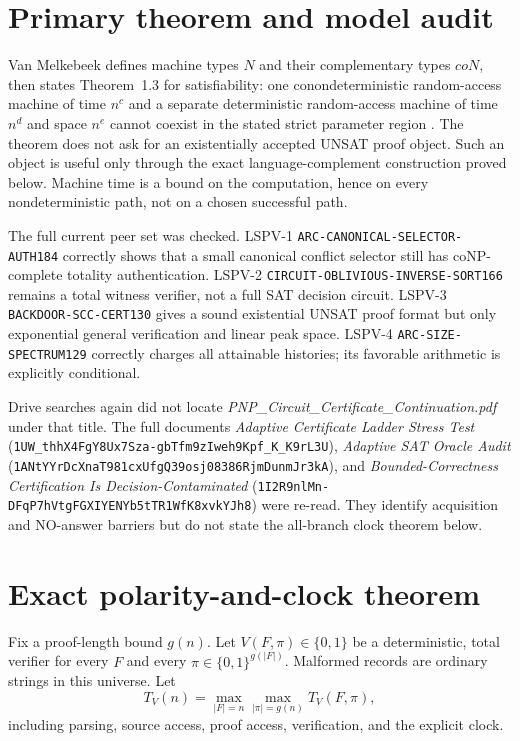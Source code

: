 \documentclass[11pt]{article}
\begin{document}
\section*{Primary theorem and model audit}
Van Melkebeek defines machine types $N$ and their complementary types $coN$,
then states Theorem~1.3 for satisfiability: one conondeterministic random-access
machine of time $n^c$ and a separate deterministic random-access machine of
time $n^d$ and space $n^e$ cannot coexist in the stated strict parameter
region \cite[Sec.~2.2, Thm.~1.3]{vm}.  The theorem does not ask for an
existentially accepted UNSAT proof object.  Such an object is useful only
through the exact language-complement construction proved below.  Machine time
is a bound on the computation, hence on every nondeterministic path, not on a
chosen successful path.

The full current peer set was checked.  LSPV-1
\texttt{ARC-CANONICAL-SELECTOR-AUTH184} correctly shows that a small canonical
conflict selector still has coNP-complete totality authentication.  LSPV-2
\texttt{CIRCUIT-OBLIVIOUS-INVERSE-SORT166} remains a total witness verifier,
not a full SAT decision circuit.  LSPV-3
\texttt{BACKDOOR-SCC-CERT130} gives a sound existential UNSAT proof format but
only exponential general verification and linear peak space.  LSPV-4
\texttt{ARC-SIZE-SPECTRUM129} correctly charges all attainable histories; its
favorable arithmetic is explicitly conditional.

Drive searches again did not locate
\emph{PNP\_Circuit\_Certificate\_Continuation.pdf} under that title.  The
full documents \emph{Adaptive Certificate Ladder Stress Test}
(\texttt{1UW\_thhX4FgY8Ux7Sza-gbTfm9zIweh9Kpf\_K\_K9rL3U}),
\emph{Adaptive SAT Oracle Audit}
(\texttt{1ANtYYrDcXnaT981cxUfgQ39osj08386RjmDunmJr3kA}), and
\emph{Bounded-Correctness Certification Is Decision-Contaminated}
(\texttt{1I2R9nlMn-DFqP7hVtgFGXIYENYb5tTR1WfK8xvkYJh8}) were re-read.  They
identify acquisition and NO-answer barriers but do not state the all-branch
clock theorem below.

\section*{Exact polarity-and-clock theorem}
Fix a proof-length bound $g(n)$.  Let $V(F,\pi)\in\{0,1\}$ be a deterministic,
total verifier for every $F$ and every $\pi\in\{0,1\}^{g(|F|)}$.  Malformed
records are ordinary strings in this universe.  Let
\[
T_V(n)=\max_{|F|=n}\max_{|\pi|=g(n)}T_V(F,\pi),
\]
including parsing, source access, proof access, verification, and the explicit
clock.
\end{document}
